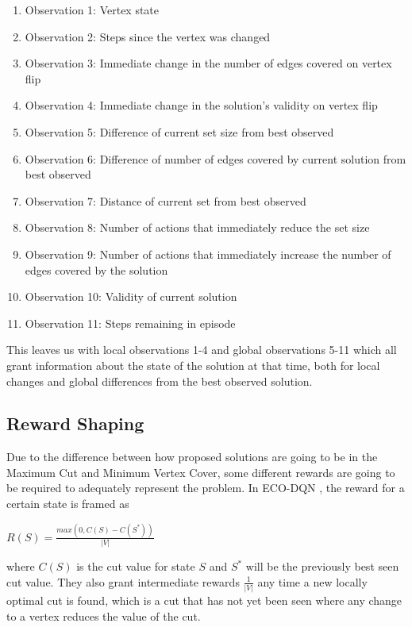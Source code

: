 \documentclass{article}
\begin{document}
\begin{enumerate}
    \item Observation 1: Vertex state
    \item Observation 2: Steps since the vertex was changed 
    \item Observation 3: Immediate change in the number of edges covered on vertex flip 
    \item Observation 4: Immediate change in the solution's validity on vertex flip 
    \item Observation 5: Difference of current set size from best observed 
    \item Observation 6: Difference of number of edges covered by current solution from best observed 
    \item Observation 7: Distance of current set from best observed 
    \item Observation 8: Number of actions that immediately reduce the set size
    \item Observation 9: Number of actions that immediately increase the number of edges covered by the solution 
    \item Observation 10: Validity of current solution 
    \item Observation 11: Steps remaining in episode 
\end{enumerate}

This leaves us with local observations 1-4 and global observations 5-11 which all grant information about the state of the solution at that time, both for local changes and global differences from the best observed solution.

\subsection{Reward Shaping}\label{sec:reward-shaping-mvc}

Due to the difference between how proposed solutions are going to be in the Maximum Cut and Minimum Vertex Cover, some different rewards are going to be required to adequately represent the problem. In ECO-DQN \cite{eco-dqn}, the reward for a certain state is framed as

$R(S) = \frac{max(0, C(S) - C(S^*))}{|V|}$

where $C(S)$ is the cut value for state $S$ and $S^*$ will be the previously best seen cut value. They also grant intermediate rewards $\frac{1}{|V|}$ any time a new locally optimal cut is found, which is a cut that has not yet been seen where any change to a vertex reduces the value of the cut.
\end{document}
